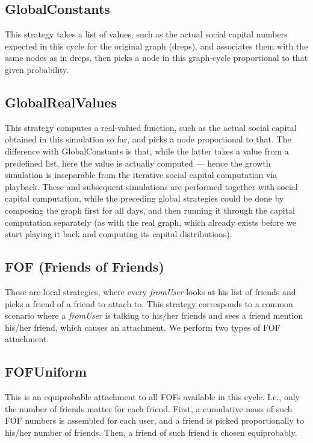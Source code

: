 \documentclass[10pt,oneside]{memoir}
\begin{document}
\subsection{GlobalConstants}
\label{globalconstants}

This strategy takes a list of values, such as the actual social capital numbers expected in this cycle for the original graph (dreps), and associates them with the same nodes as in dreps, then picks a node in this graph-cycle proportional to that given probability.


\subsection{GlobalRealValues}
\label{globalrealvalues}

This strategy computes a real-valued function, such as the actual social capital obtained in this simulation so far, and picks a node proportional to that.  The difference with GlobalConstants is that, while the latter takes a value from a predefined list, here the value is actually computed --- hence the growth simulation is inseparable from the iterative social capital computation via playback.  These and subsequent simulations are performed together with social capital computation, while the preceding global strategies could be done by composing the graph first for all days, and then running it through the capital computation separately (as with the real graph, which already exists before we start playing it back and computing its capital distributions).


\subsection{FOF (Friends of Friends)}
\label{foffriendsoffriends}

These are local strategies, where every \emph{fromUser} looks at his list of friends and picks a friend of a friend to attach to.  This strategy corresponds to a common scenario where a \emph{fromUser} is talking to his/her friends and sees a friend mention his/her friend, which causes an attachment.  We perform two types of FOF attachment.


\subsection{FOFUniform}
\label{fofuniform}

This is an equiprobable attachment to all FOFs available in this cycle.  I.e., only the number of friends matter for each friend.  First, a cumulative mass of such FOF numbers is assembled for each user, and a friend is picked proportionally to his/her number of friends.  Then, a friend of such friend is chosen equiprobably.
\end{document}
